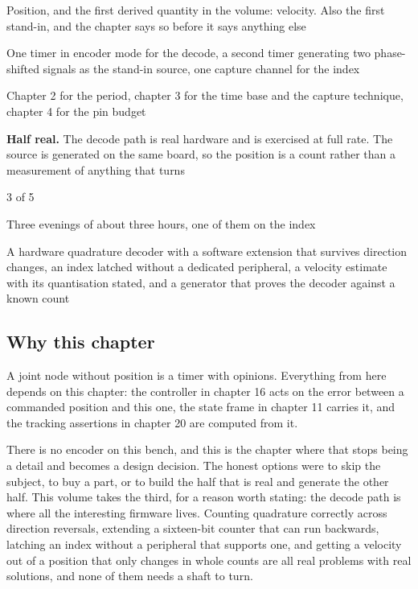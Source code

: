 
\begin{keyfacts}
\item[Adds to the node] Position, and the first derived quantity in the volume: velocity. Also the first stand-in, and the chapter says so before it says anything else
\item[Peripherals] One timer in encoder mode for the decode, a second timer generating two phase-shifted signals as the stand-in source, one capture channel for the index
\item[Depends on] Chapter 2 for the period, chapter 3 for the time base and the capture technique, chapter 4 for the pin budget
\item[Real or modelled] \textbf{Half real.} The decode path is real hardware and is exercised at full rate. The source is generated on the same board, so the position is a count rather than a measurement of anything that turns
\item[Difficulty] 3 of 5
\item[Effort] Three evenings of about three hours, one of them on the index
\item[Deliverable] A hardware quadrature decoder with a software extension that survives direction changes, an index latched without a dedicated peripheral, a velocity estimate with its quantisation stated, and a generator that proves the decoder against a known count
\end{keyfacts}

\subsection*{Why this chapter}

A joint node without position is a timer with opinions. Everything from here
depends on this chapter: the controller in chapter 16 acts on the error between
a commanded position and this one, the state frame in chapter 11 carries it, and
the tracking assertions in chapter 20 are computed from it.

There is no encoder on this bench, and this is the chapter where that stops
being a detail and becomes a design decision. The honest options were to skip
the subject, to buy a part, or to build the half that is real and generate the
other half. This volume takes the third, for a reason worth stating: the decode
path is where all the interesting firmware lives. Counting quadrature correctly
across direction reversals, extending a sixteen-bit counter that can run
backwards, latching an index without a peripheral that supports one, and getting
a velocity out of a position that only changes in whole counts are all real
problems with real solutions, and none of them needs a shaft to turn.

